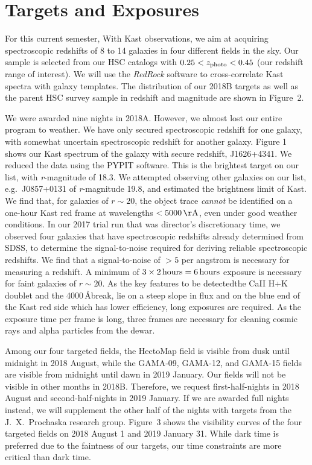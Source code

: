 \documentclass[letterpaper,12pt]{article}
\begin{document}
\clearpage

\section{Targets and Exposures}

For this current semester, With Kast observations, we aim at acquiring spectroscopic redshifts of 8 to 14 galaxies in four 
different fields in the sky. Our sample is selected from our HSC catalogs with  $0.25<z_{\rm photo}<0.45$ (our redshift 
range of interest).
We will use the {\it RedRock} software to cross-correlate Kast spectra with galaxy
templates. The distribution of our 2018B targets as well as the parent HSC survey sample in redshift and magnitude are 
shown in Figure~2. 

We were awarded nine nights in 2018A. However, we almost lost our entire program to weather. We have only secured  
spectroscopic redshift for one galaxy, with somewhat uncertain spectroscopic redshift for another galaxy. Figure 1 shows 
our Kast spectrum of the galaxy with secure redshift, J1626+4341. We reduced the data 
using the PYPIT software. This is the brightest target on our list, with {\it r}-magnitude of 18.3. We attempted 
observing other galaxies on our list, e.g.\ J0857+0131 of {\it r}-magnitude 19.8, and estimated the brightness limit of 
Kast. We find that, for galaxies of $r\sim20$, the object trace {\it cannot} be identified on a one-hour Kast red frame at 
wavelengths $<5000\,{\rm \AA}$, even under good weather conditions. 
In our 2017 trial run that was director's discretionary time, we observed 
four galaxies that have spectroscopic redshifts already determined from SDSS, to determine the signal-to-noise required 
for deriving reliable spectroscopic redshifts. We find that a signal-to-noise of $>5$ per angstrom is necessary for 
measuring a redshift. A minimum of 
$3\times2\,{\rm hours}=6\,{\rm hours}$ exposure is necessary for faint galaxies of $r\sim20$. As the key features to 
be detected{\textemdash}the CaII H+K doublet and the 4000\,\AA break, 
lie on a steep slope in flux and on the blue end of the Kast red side which has lower efficiency, long exposures are 
required. As the exposure time per frame is long, three frames are necessary for cleaning cosmic rays and alpha particles 
from the dewar. 

Among our four targeted fields, the HectoMap field is visible from dusk until midnight in 2018 August, while the GAMA-09, 
GAMA-12, and GAMA-15 fields are visible from midnight until dawn in 2019 January. Our fields will not be visible in 
other months in 2018B. Therefore, we request first-half-nights in 2018 August and second-half-nights in 2019 January. If 
we are awarded full nights instead, we will supplement the other half of the nights with targets from the J.\ X.\ 
Prochaska research group. Figure~3 shows the visibility curves of the four targeted fields on 2018 August 1 and 2019 
January 31. While dark time is preferred due to the faintness of our targets, our time constraints are more 
critical than dark time.  
\end{document}
